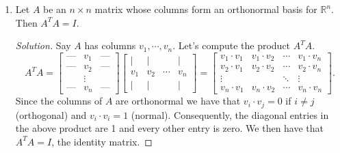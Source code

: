 \documentclass[12pt]{article}
\newenvironment{solution}
{\begin{proof}[Solution]}
{\end{proof}}
\begin{document}
\begin{enumerate}
\begin{enumerate}
		\vfill

		\item Let $A$ be an $n\times n$ matrix whose columns form an orthonormal basis for $\mathbb{R}^n$. Then $A^TA = I$.
		\begin{solution}
			Say $A$ has columns $v_1, \cdots, v_n$. Let's compute the product $A^TA$.
			\[
			A^TA = \begin{bmatrix}
				\text{---} & v_1 & \text{---}\\
				\text{---} & v_2 & \text{---}\\
				&\vdots&\\
				\text{---} & v_n & \text{---}
			\end{bmatrix}\begin{bmatrix}
				\mid &  \mid & & \mid\\
				v_1 & v_2 & \cdots &v_n\\
				\mid & \mid & &\mid
			\end{bmatrix}=
			\begin{bmatrix}
				v_1\cdot v_1 & v_1\cdot v_2 & \cdots & v_1\cdot v_n\\
				v_2\cdot v_1 & v_2\cdot v_2 & \cdots & v_2\cdot v_n\\
				\vdots &&\ddots & \vdots\\
				v_n\cdot v_1 & v_n\cdot v_2 & \cdots & v_n\cdot v_n
			\end{bmatrix}.
			\]
			Since the columns of $A$ are orthonormal we have that $v_i\cdot v_j = 0$ if $i\neq j$ (orthogonal) and $v_i\cdot v_i = 1$ (normal). Consequently, the diagonal entries in the above product are 1 and every other entry is zero. We then have that $A^TA = I$, the identity matrix.
		\end{solution}
		\vfill
	\end{enumerate}
\end{enumerate}


\end{document}
